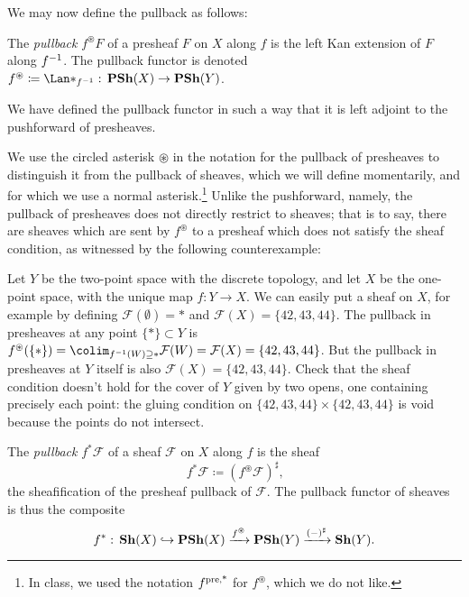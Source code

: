 We may now define the pullback as follows:
\begin{defn}
The \emph{pullback} \(f^{\circledast}F\) of a presheaf \(F\) on \(X\) along \(f\) is the left Kan extension of \(F\) along \(f^{-1}\).
The pullback functor is denoted \(f^{\circledast}\coloneq\Lan*_{f\inv}\colon\catPresheaf(X)\to\catPresheaf(Y)\).
\end{defn}

We have defined the pullback functor in such a way that it is left adjoint to the pushforward of presheaves.

We use the circled asterisk \(\circledast\) in the notation for the pullback of presheaves to distinguish it from the pullback of sheaves, which we will define momentarily, and for which we use a normal asterisk.\footnote{In class, we used the notation $f^{\textup{pre,*}}$ for $f^\circledast$, which we do not like.}
Unlike the pushforward, namely, the pullback of presheaves does not directly restrict to sheaves; that is to say, there are sheaves which are sent by \(f^{\circledast}\) to a presheaf which does not satisfy the sheaf condition, as witnessed by the following counterexample:

\begin{exmp}
Let $Y$ be the two-point space with the discrete topology, and let $X$ be the one-point space, with the unique map $f: Y \to X$. 
We can easily put a sheaf on $X$, for example by defining $\mathcal{F}(\emptyset) = *$ and $\mathcal{F}(X) = \{42, 43, 44\}$. 
The pullback in presheaves at any point $\{*\} \subset Y$ is $f^{\circledast}(\{*\}) = \colim_{f^{-1}(W) \supseteq *}\mathcal{F}(W) = \mathcal{F}(X) = \{42, 43, 44\}$. But the pullback in presheaves at $Y$ itself is also $\mathcal{F}(X) = \{42, 43, 44\}$. Check that the sheaf condition doesn't hold for the cover of $Y$ given by two opens, one containing precisely each point: the gluing condition on $\{42,43,44\} \times \{42, 43, 44\}$ is void because the points do not intersect.
\end{exmp}

\begin{defn}
The \emph{pullback} \(f^*\mathcal F\) of a sheaf \(\mathcal F\) on \(X\) along \(f\) is the sheaf
\[ f^*\mathcal F \coloneq (f^{\circledast}\mathcal F)^\sharp\text{,} \]
the sheafification of the presheaf pullback of \(\mathcal F\).
The pullback functor of sheaves is thus the composite
\[ f^* \colon \catSheaf(X) \hookrightarrow \catPresheaf(X) \xrightarrow{f^{\circledast}} \catPresheaf(Y) \xrightarrow{(-)^\sharp} \catSheaf(Y)\text{.} \]
\end{defn}

